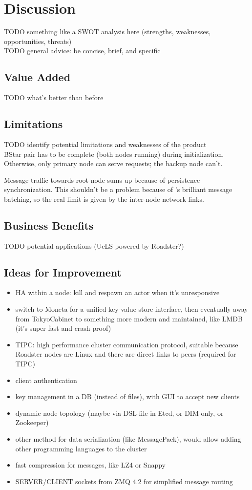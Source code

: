 \chapter{Discussion}
TODO something like a SWOT analysis here (strengths, weaknesses, opportunities, threats)\\
TODO general advice: be concise, brief, and specific\\

\section{Value Added}
TODO what's better than before\\

\section{Limitations}
TODO identify potential limitations and weaknesses of the product\\

BStar pair has to be complete (both nodes running) during initialization. Otherwise, only primary node can serve requests; the backup node can't.

Message traffic towards root node sums up because of persistence synchronization. This shouldn't be a problem because of \zmq's brilliant message batching, so the real limit is given by the inter-node network links.

\section{Business Benefits}
TODO potential applications (UeLS powered by Roadster?)\\

\section{Ideas for Improvement}
\begin{itemize}
	\item HA within a node: kill and respawn an actor when it's unresponsive
	\item switch to Moneta for a unified key-value store interface, then eventually away from TokyoCabinet to something more modern and maintained, like LMDB (it's super fast and crash-proof)
	\item TIPC: high performance cluster communication protocol, suitable because Roadster nodes are Linux and there are direct links to peers (required for TIPC)
	\item client authentication
	\item key management in a DB (instead of files), with GUI to accept new clients
	\item dynamic node topology (maybe via DSL-file in Etcd, or DIM-only, or Zookeeper)
	\item other method for data serialization (like MessagePack), would allow adding other programming languages to the cluster
	\item fast compression for messages, like LZ4 or Snappy
	\item SERVER/CLIENT sockets from ZMQ 4.2 for simplified message routing
\end{itemize}
